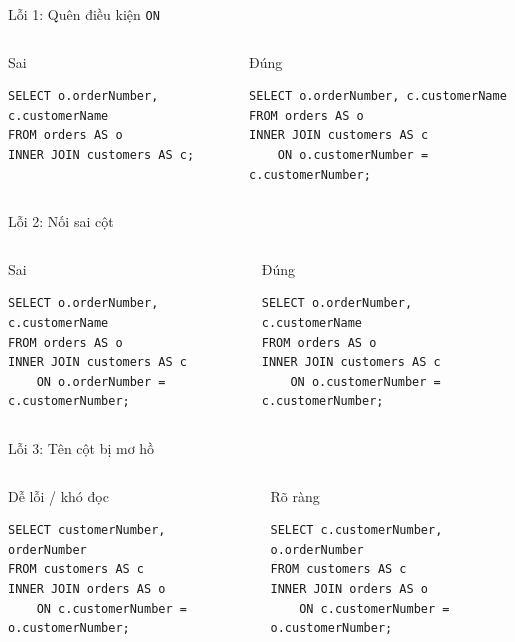 \documentclass[aspectratio=169,11pt]{beamer}
\begin{document}
\begin{frame}[fragile]{Lỗi 1: Quên điều kiện \texttt{ON}}
\begin{columns}[T,onlytextwidth]
\begin{block}{Sai}
\begin{lstlisting}
SELECT o.orderNumber, c.customerName
FROM orders AS o
INNER JOIN customers AS c;
\end{lstlisting}
\end{block}
\begin{block}{Đúng}
\begin{lstlisting}
SELECT o.orderNumber, c.customerName
FROM orders AS o
INNER JOIN customers AS c
    ON o.customerNumber = c.customerNumber;
\end{lstlisting}
\end{block}
\end{columns}
\end{frame}

\begin{frame}[fragile]{Lỗi 2: Nối sai cột}
\begin{columns}[T,onlytextwidth]
\begin{block}{Sai}
\begin{lstlisting}
SELECT o.orderNumber, c.customerName
FROM orders AS o
INNER JOIN customers AS c
    ON o.orderNumber = c.customerNumber;
\end{lstlisting}
\end{block}
\begin{block}{Đúng}
\begin{lstlisting}
SELECT o.orderNumber, c.customerName
FROM orders AS o
INNER JOIN customers AS c
    ON o.customerNumber = c.customerNumber;
\end{lstlisting}
\end{block}
\end{columns}
\end{frame}

\begin{frame}[fragile]{Lỗi 3: Tên cột bị mơ hồ}
\begin{columns}[T,onlytextwidth]
\begin{block}{Dễ lỗi / khó đọc}
\begin{lstlisting}
SELECT customerNumber, orderNumber
FROM customers AS c
INNER JOIN orders AS o
    ON c.customerNumber = o.customerNumber;
\end{lstlisting}
\end{block}
\begin{block}{Rõ ràng}
\begin{lstlisting}
SELECT c.customerNumber, o.orderNumber
FROM customers AS c
INNER JOIN orders AS o
    ON c.customerNumber = o.customerNumber;
\end{lstlisting}
\end{block}
\end{columns}
\end{frame}
\end{document}
